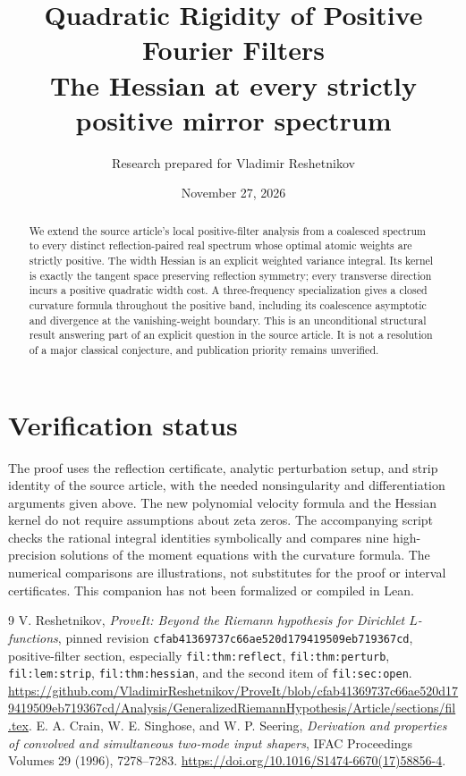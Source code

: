 
\title{Quadratic Rigidity of Positive Fourier Filters\\\large The Hessian at every strictly positive mirror spectrum}
\author{Research prepared for Vladimir Reshetnikov}
\date{November 27, 2026}

\maketitle
\begin{abstract}
We extend the source article's local positive-filter analysis from a
coalesced spectrum to every distinct reflection-paired real spectrum
whose optimal atomic weights are strictly positive. The width Hessian is
an explicit weighted variance integral. Its kernel is exactly the tangent
space preserving reflection symmetry; every transverse direction incurs
a positive quadratic width cost. A three-frequency specialization gives
a closed curvature formula throughout the positive band, including its
coalescence asymptotic and divergence at the vanishing-weight boundary.
This is an unconditional structural result answering part of an explicit
question in the source article. It is not a resolution of a major
classical conjecture, and publication priority remains unverified.
\end{abstract}
{\setlength{\parskip}{0pt}\tableofcontents}

\section{Verification status}
The proof uses the reflection certificate, analytic perturbation setup,
and strip identity of the source article, with the needed nonsingularity
and differentiation arguments given above. The new polynomial velocity
formula and the Hessian kernel do not require assumptions about zeta
zeros. The accompanying script checks the rational integral identities
symbolically and compares nine high-precision solutions of the moment
equations with the curvature formula. The numerical comparisons are
illustrations, not substitutes for the proof or interval certificates.
This companion has not been formalized or compiled in Lean.
{\small\raggedright
\begin{thebibliography}{9}
 V. Reshetnikov, \emph{ProveIt: Beyond the Riemann
hypothesis for Dirichlet $L$-functions}, pinned revision
\texttt{cfab41369737c66ae520d179419509eb719367cd}, positive-filter section,
especially \texttt{fil:thm:reflect}, \texttt{fil:thm:perturb},
\texttt{fil:lem:strip}, \texttt{fil:thm:hessian}, and the second item of
\texttt{fil:sec:open}.\newline
\url{https://github.com/VladimirReshetnikov/ProveIt/blob/cfab41369737c66ae520d179419509eb719367cd/Analysis/GeneralizedRiemannHypothesis/Article/sections/fil.tex}.
 E. A. Crain, W. E. Singhose, and W. P. Seering,
\emph{Derivation and properties of convolved and simultaneous two-mode
input shapers}, IFAC Proceedings Volumes 29 (1996), 7278--7283.
\url{https://doi.org/10.1016/S1474-6670(17)58856-4}.
\end{thebibliography}
}

